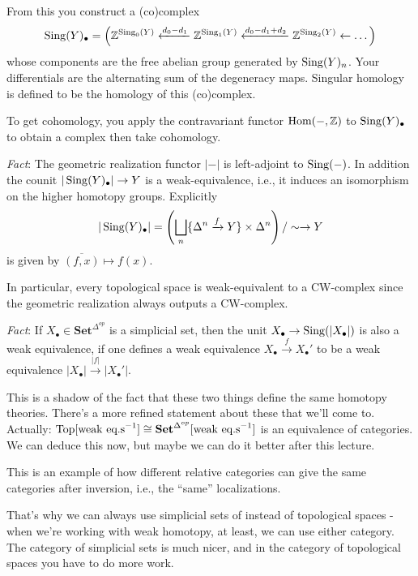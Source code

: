 \documentclass[../MH_Total.tex]{subfiles}
\begin{document}
\begin{remark}
	From this you construct a (co)complex 
	\[
	\operatorname{Sing}(Y)_\bullet = \left(\mathbb{Z}^{\operatorname{Sing}_0(Y)} \xleftarrow{d_0 - d_1} \mathbb{Z}^{\operatorname{Sing}_1(Y)} \xleftarrow{d_0 - d_1 + d_2} \mathbb{Z}^{\operatorname{Sing}_2(Y)} \leftarrow \dots\right)
	\]
	whose components are the free abelian group generated by $\operatorname{Sing}(Y)_n$. Your differentials are the alternating sum of the degeneracy maps. Singular homology is defined to be the homology of this (co)complex.

	To get cohomology, you apply the contravariant functor $\operatorname{Hom}(-,\mathbb{Z})$ to $\operatorname{Sing}(Y)_\bullet$ to obtain a complex then take cohomology.
\end{remark}

\emph{Fact}: The geometric realization functor $|-|$ is left-adjoint to $\operatorname{Sing}(-)$. In addition the counit $|\operatorname{Sing}(Y)_\bullet| \to Y$ is a weak-equivalence, i.e., it induces an isomorphism on the higher homotopy groups.
Explicitly
\[
|\operatorname{Sing}(Y)_\bullet| = \left(\bigsqcup_n \{\Delta^n \xrightarrow{f} Y\} \times \Delta^n\right)/\sim \to Y
\]
is given by $\overline{(f,x)} \mapsto f(x)$.

In particular, every topological space is weak-equivalent to a CW-complex since the geometric realization always outputs a CW-complex. 

\emph{Fact}: If $X_\bullet \in \mathbf{Set}^{\Delta^{op}}$ is a simplicial set, then the unit $X_\bullet \to \operatorname{Sing}(|X_\bullet|)$ is also a weak equivalence, if one defines a weak equivalence $X_\bullet \xrightarrow{f} X_\bullet'$ to be a weak equivalence $|X_\bullet| \xrightarrow{|f|} |X_\bullet'|$. 

This is a shadow of the fact that these two things define the same homotopy theories. There's a more refined statement about these that we'll come to. Actually: $\operatorname{Top}[\text{weak eq.s}^{-1}] \cong \mathbf{Set}^{\Delta^{op}}[\text{weak eq.s}^{-1}]$ is an equivalence of categories. We can deduce this now, but maybe we can do it better after this lecture.

This is an example of how different relative categories can give the same categories after inversion, i.e., the ``same'' localizations. 

That's why we can always use simplicial sets of instead of topological spaces - when we're working with weak homotopy, at least, we can use either category. The category of simplicial sets is much nicer, and in the category of topological spaces you have to do more work.
\end{document}

